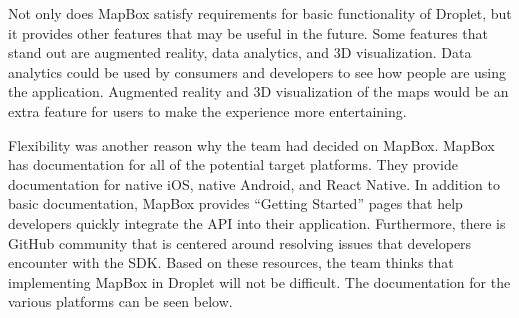 \documentclass[draftclsnofoot, onecolumn, letterpaper,10pt,compsoc]{IEEEtran}
\begin{document}
 Not only does MapBox satisfy requirements for basic functionality of Droplet, but it provides other features that may be useful in the future. Some features that stand out are augmented reality, data analytics, and 3D visualization. Data analytics could be used by consumers and developers to see how people are using the application. Augmented reality and 3D visualization of the maps would be an extra feature for users to make the experience more entertaining. 


Flexibility was another reason why the team had decided on MapBox. MapBox has documentation for all of the potential target platforms. They provide documentation for native iOS, native Android, and React Native. In addition to basic documentation, MapBox provides “Getting Started” pages that help developers quickly integrate the API into their application. Furthermore, there is GitHub community that is centered around resolving issues that developers encounter with the SDK. Based on these resources, the team thinks that implementing MapBox in Droplet will not be difficult. The documentation for the various platforms can be seen below.
\end{document}
